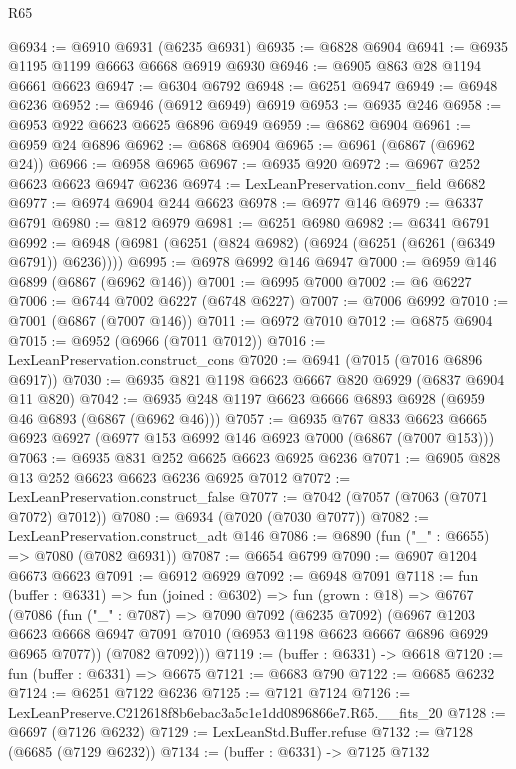 \begin{lexlean}{R65}
\begin{coremodule}
{@6934 := @6910 @6931 (@6235 @6931)
@6935 := @6828 @6904
@6941 := @6935 @1195 @1199 @6663 @6668 @6919 @6930
@6946 := @6905 @863 @28 @1194 @6661 @6623
@6947 := @6304 @6792
@6948 := @6251 @6947
@6949 := @6948 @6236
@6952 := @6946 (@6912 @6949) @6919
@6953 := @6935 @246
@6958 := @6953 @922 @6623 @6625 @6896 @6949
@6959 := @6862 @6904
@6961 := @6959 @24 @6896
@6962 := @6868 @6904
@6965 := @6961 (@6867 (@6962 @24))
@6966 := @6958 @6965
@6967 := @6935 @920
@6972 := @6967 @252 @6623 @6623 @6947 @6236
@6974 := LexLeanPreservation.conv_field @6682
@6977 := @6974 @6904 @244 @6623
@6978 := @6977 @146
@6979 := @6337 @6791
@6980 := @812 @6979
@6981 := @6251 @6980
@6982 := @6341 @6791
@6992 := @6948 (@6981 (@6251 (@824 @6982) (@6924 (@6251 (@6261 (@6349 @6791)) @6236))))
@6995 := @6978 @6992 @146 @6947
@7000 := @6959 @146 @6899 (@6867 (@6962 @146))
@7001 := @6995 @7000
@7002 := @6 @6227
@7006 := @6744 @7002 @6227 (@6748 @6227)
@7007 := @7006 @6992
@7010 := @7001 (@6867 (@7007 @146))
@7011 := @6972 @7010
@7012 := @6875 @6904
@7015 := @6952 (@6966 (@7011 @7012))
@7016 := LexLeanPreservation.construct_cons
@7020 := @6941 (@7015 (@7016 @6896 @6917))
@7030 := @6935 @821 @1198 @6623 @6667 @820 @6929 (@6837 @6904 @11 @820)
@7042 := @6935 @248 @1197 @6623 @6666 @6893 @6928 (@6959 @46 @6893 (@6867 (@6962 @46)))
@7057 := @6935
    @767
    @833
    @6623
    @6665
    @6923
    @6927
    (@6977 @153 @6992 @146 @6923 @7000 (@6867 (@7007 @153)))
@7063 := @6935 @831 @252 @6625 @6623 @6925 @6236
@7071 := @6905 @828 @13 @252 @6623 @6623 @6236 @6925 @7012
@7072 := LexLeanPreservation.construct_false
@7077 := @7042 (@7057 (@7063 (@7071 @7072) @7012))
@7080 := @6934 (@7020 (@7030 @7077))
@7082 := LexLeanPreservation.construct_adt @146
@7086 := @6890 (fun ("_" : @6655) => @7080 (@7082 @6931))
@7087 := @6654 @6799
@7090 := @6907 @1204 @6673 @6623
@7091 := @6912 @6929
@7092 := @6948 @7091
@7118 := fun (buffer : @6331) =>
  fun (joined : @6302) =>
  fun (grown : @18) =>
  @6767
    (@7086
      (fun ("_" : @7087) =>
      @7090
        @7092
        (@6235 @7092)
        (@6967
          @1203
          @6623
          @6668
          @6947
          @7091
          @7010
          (@6953 @1198 @6623 @6667 @6896 @6929 @6965 @7077))
        (@7082 @7092)))
@7119 := (buffer : @6331) -> @6618
@7120 := fun (buffer : @6331) => @6675
@7121 := @6683 @790
@7122 := @6685 @6232
@7124 := @6251 @7122 @6236
@7125 := @7121 @7124
@7126 := LexLeanPreserve.C212618f8b6ebac3a5c1e1dd0896866e7.R65.__fits_20
@7128 := @6697 (@7126 @6232)
@7129 := LexLeanStd.Buffer.refuse
@7132 := @7128 (@6685 (@7129 @6232))
@7134 := (buffer : @6331) -> @7125 @7132
}
\end{coremodule}
\end{lexlean}
